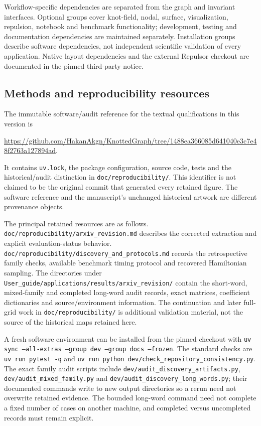 \documentclass[10pt,twocolumn]{article}
\begin{document}
Workflow-specific dependencies are separated from the graph and invariant interfaces. Optional groups cover knot-field, nodal, surface, visualization, repulsion, notebook and benchmark functionality; development, testing and documentation dependencies are maintained separately. Installation groups describe software dependencies, not independent scientific validation of every application. Native layout dependencies and the external Repulsor checkout are documented in the pinned third-party notice.

\subsection{Methods and reproducibility resources}
\label{supp:reproducibility_resources}
The immutable software/audit reference for the textual qualifications in this version is
\begin{center}
\url{https://github.com/HakanAkgn/KnottedGraph/tree/1488ea366085d641040e3c7e48f2763a127894ad}.
\end{center}
It contains \texttt{uv.lock}, the package configuration, source code, tests and the historical/audit distinction in \texttt{doc/reproducibility/}. This identifier is not claimed to be the original commit that generated every retained figure. The software reference and the manuscript's unchanged historical artwork are different provenance objects.

The principal retained resources are as follows. \texttt{doc/reproducibility/arxiv\_revision.md} describes the corrected extraction and explicit evaluation-status behavior. \texttt{doc/reproducibility/discovery\_and\_protocols.md} records the retrospective family checks, available benchmark timing protocol and recovered Hamiltonian sampling. The directories under \texttt{User\_guide/applications/results/arxiv\_revision/} contain the short-word, mixed-family and completed long-word audit records, exact matrices, coefficient dictionaries and source/environment information. The continuation and later full-grid work in \texttt{doc/reproducibility/} is additional validation material, not the source of the historical maps retained here.

A fresh software environment can be installed from the pinned checkout with \texttt{uv sync --all-extras --group dev --group docs --frozen}. The standard checks are \texttt{uv run pytest -q} and \texttt{uv run python dev/check\_repository\_consistency.py}. The exact family audit scripts include \texttt{dev/audit\_discovery\_artifacts.py}, \texttt{dev/audit\_mixed\_family.py} and \texttt{dev/audit\_discovery\_long\_words.py}; their documented commands write to new output directories so a rerun need not overwrite retained evidence. The bounded long-word command need not complete a fixed number of cases on another machine, and completed versus uncompleted records must remain explicit.
\end{document}
